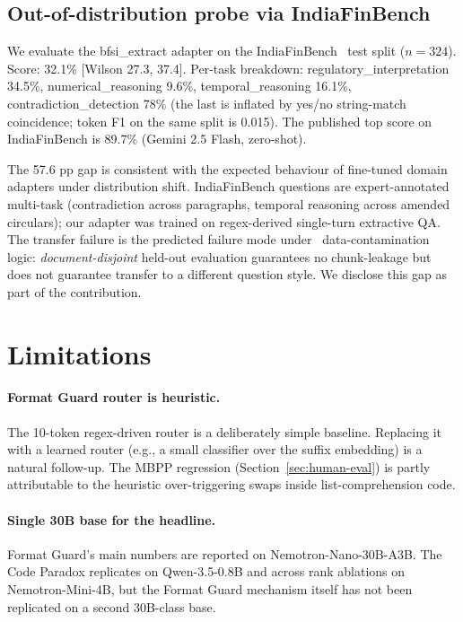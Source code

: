 \documentclass{article}
\begin{document}
\subsection{Out-of-distribution probe via IndiaFinBench}

We evaluate the bfsi\_extract adapter on the IndiaFinBench~\citep{pall2026indiafinbench} test split ($n=324$). Score: 32.1\% [Wilson 27.3, 37.4]. Per-task breakdown: regulatory\_interpretation 34.5\%, numerical\_reasoning 9.6\%, temporal\_reasoning 16.1\%, contradiction\_detection 78\% (the last is inflated by yes/no string-match coincidence; token F1 on the same split is 0.015). The published top score on IndiaFinBench is 89.7\% (Gemini 2.5 Flash, zero-shot).

The 57.6 pp gap is consistent with the expected behaviour of fine-tuned domain adapters under distribution shift. IndiaFinBench questions are expert-annotated multi-task (contradiction across paragraphs, temporal reasoning across amended circulars); our adapter was trained on regex-derived single-turn extractive QA. The transfer failure is the predicted failure mode under~\citet{magar2022data} data-contamination logic: \emph{document-disjoint} held-out evaluation guarantees no chunk-leakage but does not guarantee transfer to a different question style. We disclose this gap as part of the contribution.


\section{Limitations}
\label{sec:limitations}

\paragraph{Format Guard router is heuristic.} The 10-token regex-driven router is a deliberately simple baseline. Replacing it with a learned router (e.g., a small classifier over the suffix embedding) is a natural follow-up. The MBPP regression (Section~\ref{sec:human-eval}) is partly attributable to the heuristic over-triggering swaps inside list-comprehension code.

\paragraph{Single 30B base for the headline.} Format Guard's main numbers are reported on Nemotron-Nano-30B-A3B. The Code Paradox replicates on Qwen-3.5-0.8B and across rank ablations on Nemotron-Mini-4B, but the Format Guard mechanism itself has not been replicated on a second 30B-class base.
\end{document}
